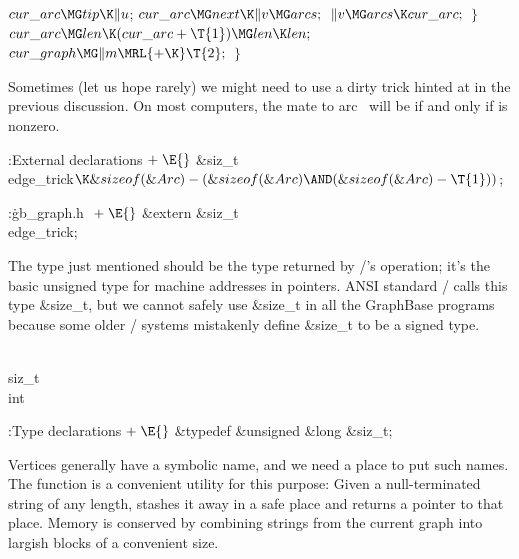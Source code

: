 ${}\\{cur\_arc}\MG\\{tip}\K\|u{}$;\5
${}\\{cur\_arc}\MG\\{next}\K\|v\MG\\{arcs};{}$\6
${}\|v\MG\\{arcs}\K\\{cur\_arc};{}$\6
\4${}\}{}$\2\6
${}\\{cur\_arc}\MG\\{len}\K(\\{cur\_arc}+\T{1})\MG\\{len}\K\\{len};{}$\6
${}\\{cur\_graph}\MG\|m\MRL{+{\K}}\T{2};{}$\6
\4${}\}{}$\2\par
\fi

Sometimes (let us hope rarely) we might need to use a dirty trick
hinted at in the previous discussion. On most computers, the mate to
arc~ will be  if and only if 
is nonzero.

\Y\B\4:External declarations\X${}\mathrel+\E{}$\6
\&{siz\_t} \\{edge\_trick}${}\K\&{sizeof}(\&{Arc})-(\&{sizeof}(\&{Arc})\AND(%
\&{sizeof}(\&{Arc})-\T{1})){}$;\par
\fi

\B{}:\.{gb\_graph.h }\X${}\mathrel+\E{}$\6
\&{extern} \&{siz\_t} \\{edge\_trick};\par
\fi

The type  just mentioned should be the type returned by %
\CEE/'s
 operation; it's the basic unsigned type for machine
addresses in pointers. ANSI standard \CEE/ calls this type \&{size\_t},
but we cannot safely use \&{size\_t} in all the GraphBase programs
because some older \CEE/
systems mistakenly define \&{size\_t} to be a signed type.

\Y\B\F\\{siz\_t}\5
\\{int}\par
\Y\B\4:Type declarations\X${}\mathrel+\E{}$\6
\&{typedef} \&{unsigned} \&{long} \&{siz\_t};\par
\fi

Vertices generally have a symbolic name, and we need a place to put
such names. The  function is a convenient utility
for this purpose:
Given a null-terminated string of any length,  stashes
it away in a safe place and returns a pointer to that place. Memory is
conserved by combining strings from the current graph into largish blocks
of a convenient size.

